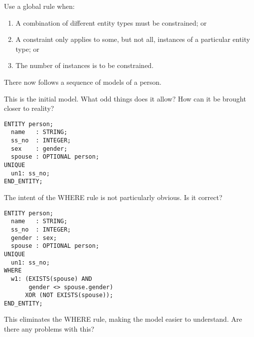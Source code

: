 
    Use a global rule when:
\begin{enumerate}
\item A combination of different entity types must be constrained; or
\item A constraint only applies to some, but not all, instances of
      a particular entity type; or
\item The number of instances is to be constrained.
\end{enumerate}


\begin{remarks}
\remintro
{}

    There now follows a sequence of models of a person.

    This is the initial model. What odd things does it allow?
How can it be brought closer to reality?

\remend
\end{remarks}


\begin{verbatim}
ENTITY person;
  name   : STRING;
  ss_no  : INTEGER;
  sex    : gender;
  spouse : OPTIONAL person;
UNIQUE
  un1: ss_no;
END_ENTITY;
\end{verbatim}


\begin{remarks}
\remintro
{}

The intent of the WHERE rule is not particularly obvious.
Is it correct?

\remend
\end{remarks}


\begin{verbatim}
ENTITY person;
  name   : STRING;
  ss_no  : INTEGER;
  gender : sex;
  spouse : OPTIONAL person;
UNIQUE
  un1: ss_no;
WHERE
  w1: (EXISTS(spouse) AND 
       gender <> spouse.gender)
      XOR (NOT EXISTS(spouse));
END_ENTITY;
\end{verbatim}


\begin{remarks}
\remintro
{}

    This eliminates the WHERE rule, making the model easier to
understand. Are there any problems with this?

\remend
\end{remarks}

